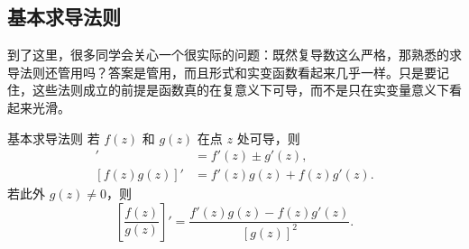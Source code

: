 \subsection{基本求导法则}

到了这里，很多同学会关心一个很实际的问题：既然复导数这么严格，那熟悉的求导法则还管用吗？答案是管用，而且形式和实变函数看起来几乎一样。只是要记住，这些法则成立的前提是函数真的在复意义下可导，而不是只在实变量意义下看起来光滑。

\begin{dingli}{基本求导法则}{}
若 $f(z)$ 和 $g(z)$ 在点 $z$ 处可导，则
\begin{align}
    [f(z)\pm g(z)]'&=f'(z)\pm g'(z),\\
    [f(z)g(z)]'&=f'(z)g(z)+f(z)g'(z).
\end{align}
若此外 $g(z)\neq 0$，则
\begin{equation}
    \left[\frac{f(z)}{g(z)}\right]'
    =\frac{f'(z)g(z)-f(z)g'(z)}{[g(z)]^2}.
\end{equation}
\end{dingli}

